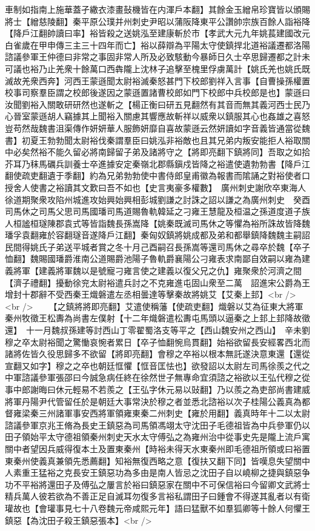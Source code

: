 車制如指南上施華蓋孑繖衣漆畫鼔機皆在内渾戶本翻】其餘金玉繒帛珍寶皆以頒賜將士【繒慈陵翻】秦平原公璞并州刺史尹昭以蒲阪降東平公讚帥宗族百餘人詣裕降【降戶江翻帥讀曰率】裕皆殺之送姚泓至建康斬於市【孝武大元九年姚萇建國改元白雀歲在甲申傳三主三十四年而亡】裕以薛辯為平陽太守使鎮捍北道裕議遷都洛陽諮議參軍王仲德曰非常之事固非常人所及必致駭動今暴師日久士卒思歸遷都之計未可議也裕乃止羌衆十餘萬口西犇隴上沈林子追擊至槐里俘虜萬計【姚氏羌也姚氏既滅故羌衆西奔】河西王蒙遜聞太尉裕滅秦怒甚門下校郎劉祥入言事【自曹操孫權置校事司察羣臣謂之校郎後遂因之蒙遜置諸曹校郎如門下校郎中兵校郎是也】蒙遜曰汝聞劉裕入關敢研研然也遂斬之【楊正衡曰研五見翻然有其音而無其義河西士民乃心晉室蒙遜胡人竊據其上聞裕入關慮其響應故斬祥以威衆以鎮服其心也姦雄之喜怒豈苟然哉魏書沮渠傳作妍妍華人服飾妍靡自喜故蒙遜云然妍讀如字音義皆通當從魏書】初夏王勃勃聞太尉裕伐秦謂羣臣曰姚泓非裕敵也且其兄弟内叛安能拒人裕取關中必矣然裕不能久留必將南歸留子弟及諸將守之【將即亮翻下鎮將同】吾取之如拾芥耳乃秣馬礪兵訓養士卒進據安定秦嶺北郡縣鎭戍皆降之裕遣使遺勃勃書【降戶江翻使疏吏翻遺于季翻】約為兄弟勃勃使中書侍郎皇甫徽為報書而隂誦之對裕使者口授舍人使書之裕讀其文歎曰吾不如也【史言夷豪多權數】　廣州刺史謝欣卒東海人徐道期聚衆攻陷州城進攻始興始興相彭城劉謙之討誅之詔以謙之為廣州刺史　癸酉司馬休之司馬父思司馬國璠司馬道賜魯軌韓延之刁雍王慧龍及桓温之孫道度道子族人桓謐桓璲陳郡袁式等皆詣魏長孫嵩降【姚秦既滅司馬休之等懼為裕所誅故皆降魏璠孚袁翻雍於容翻璲音遂降戶江翻】秦匈奴鎮將姚成都及弟和都舉鎮降魏魏主嗣詔民間得姚氏子弟送平城者賞之冬十月己酉嗣召長孫嵩等還司馬休之尋卒於魏【卒子恤翻】魏賜國璠爵淮南公道賜爵池陽子魯軌爵襄陽公刁雍表求南鄙自效嗣以雍為建義將軍【建義將軍魏以是號寵刁雍言使之建義以復父兄之仇】雍聚衆於河濟之間【濟子禮翻】擾動徐兖太尉裕遣兵討之不克雍進屯固山衆至二萬　詔進宋公爵為王增封十郡辭不受西秦王熾磐遣左丞相曇達等擊秦故將姚艾【艾秦上邽】<br />
<br />
　　【之鎮將將即亮翻】艾遣使稱藩【使疏吏翻】熾磐以艾為征東大將軍秦州牧徵王松夀為尚書左僕射【十二年熾磐遣松夀屯馬頭以逼秦之上邽上邽降故徵還】　十一月魏叔孫建等討西山丁零翟蜀洛支等平之【西山魏安州之西山】　辛未劉穆之卒太尉裕聞之驚慟哀惋者累日【卒子恤翻惋烏貫翻】始裕欲留長安經畧西北而諸將佐皆久役思歸多不欲留【將即亮翻】會穆之卒裕以根本無託遂決意東還【還從宣翻又如字】穆之之卒也朝廷恇懼【恇音匡怯也】欲發詔以太尉左司馬徐羨之代之中軍諮議參軍張邵曰今誠急病任終在徐然世子無專命宜須諮之裕欲以王弘代穆之從事中郎謝晦曰休元輕易不若羨之【王弘字休元易以䜴翻】乃以羨之為吏部尚書建威將軍丹陽尹代管留任於是朝廷大事常決於穆之者並悉北諮裕以次子桂陽公義真為都督雍梁秦三州諸軍事安西將軍領雍東秦二州刺史【雍於用翻】義真時年十二以太尉諮議參軍京兆王脩為長史王鎮惡為司馬領馮翊太守沈田子毛德祖皆為中兵參軍仍以田子領始平太守德祖領秦州刺史天水太守傅弘之為雍州治中從事史先是隴上流戶寓關中者望因兵威得復本土及置東秦州【時裕未得天水東秦州即毛德祖所領或曰裕置東秦州使義真兼領先悉薦翻】知裕無復西略之意【復扶又翻下同】皆嘆息失望關中人素重王猛裕之克長安王鎮惡功為多由是南人皆忌之沈田子自以嶢柳之捷與鎮惡争功不平裕將還田子及傅弘之屢言於裕曰鎮惡家在關中不可保信裕曰今留卿文武將士精兵萬人彼若欲為不善正足自滅耳勿復多言裕私謂田子曰鍾會不得遂其亂者以有衛瓘故也【會瓘事見七十八卷魏元帝咸熙元年】語曰猛獸不如羣狐卿等十餘人何懼王鎮惡【為沈田子殺王鎮惡張本】<br />
